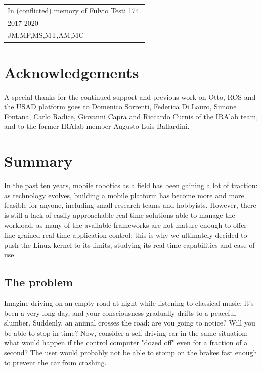 \documentclass[a4paper,12pt]{report}
\begin{document}

\newpage
\begin{flushright}
  \itshape
  \begin{tabular}{@{}l@{}}
    In (conflicted) memory of Fulvio Testi 174.\\
    2017-2020\\ JM,MP,MS,MT,AM,MC 
  \end{tabular}
\end{flushright}
\newpage
\tableofcontents
\newpage
\setlength{\parskip}{1em}
\chapter*{Acknowledgements}
A special thanks for the continued support and previous work on Otto, ROS and the USAD platform goes to Domenico Sorrenti, Federica Di Lauro, Simone Fontana, Carlo Radice, Giovanni Capra and Riccardo Curnis of the IRAlab team, and to the former IRAlab member Augusto Luis Ballardini.

\chapter{Summary}

In the past ten years, mobile robotics as a field has been gaining a lot of traction: as technology evolves, building a mobile platform has become more and more feasible for anyone, including small research teams and hobbyists. However, there is still a lack of easily approachable real-time solutions able to manage the workload, as many of the available frameworks are not mature enough to offer fine-grained real time application control: this is why we ultimately decided to push the Linux kernel to its limits, studying its real-time capabilities and ease of use.

\section{The problem}

Imagine driving on an empty road at night while listening to classical music: it's been a very long day, and your consciousness gradually drifts to a peaceful slumber. Suddenly, an animal crosses the road: are you going to notice? Will you be able to stop in time? Now, consider a self-driving car in the same situation: what would happen if the control computer "dozed off" even for a fraction of a second? The user would probably not be able to stomp on the brakes fast enough to prevent the car from crashing.
\end{document}
